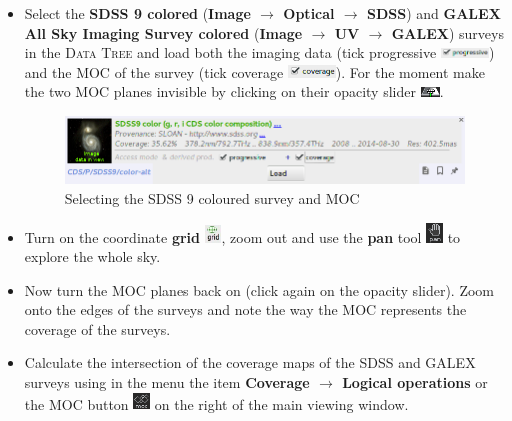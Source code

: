 \documentclass [a4paper, 12pt]{article}
\begin{document}
\begin{itemize}
    \item Select the \textbf{SDSS 9 colored} (\textbf{Image $\rightarrow$
Optical $\rightarrow$ SDSS}) and \textbf{GALEX All Sky Imaging Survey
colored} (\textbf{Image $\rightarrow$ UV $\rightarrow$ GALEX}) surveys in the
\textsc{Data Tree} and load both the imaging data (tick progressive
\includegraphics[width=0.1\textwidth]{../images/aladin_load_progessive.png})
and the MOC of the survey (tick coverage
\includegraphics[width=0.1\textwidth]{../images/aladin_load_coverage.png}). For
the moment make the two MOC planes invisible by clicking on their opacity slider
\includegraphics[width=0.04\textwidth]{../images/aladin_button_opacity.png}.
\begin{figure}[H]
\center
\includegraphics[width=0.7
\textwidth]{../images/aladin_load_sdss-image-moc.png}
\caption{Selecting the SDSS 9 coloured survey and MOC}
\label{fig:aladinselect}
\end{figure}

    \item Turn on the coordinate \textbf{grid}
\includegraphics[width=0.035\textwidth]{../images/aladin_button_grid.jpg}, zoom
out and use
the \textbf{pan} tool
\includegraphics[width=0.035\textwidth]{../images/aladin_button_pan.png} to
explore the whole sky.

    \item Now turn the MOC planes back on (click again on the opacity slider).
Zoom onto the edges of the surveys and note the way the MOC represents the
coverage of the surveys.

    \item Calculate the intersection of the coverage maps of the SDSS and
GALEX surveys using in the menu the item \textbf{Coverage $\rightarrow$
Logical operations} or the MOC button
\includegraphics[width=0.035\textwidth]{../images/aladin_button_moc.png} on the
right of the main viewing window.


\end{itemize}
\end{document}
